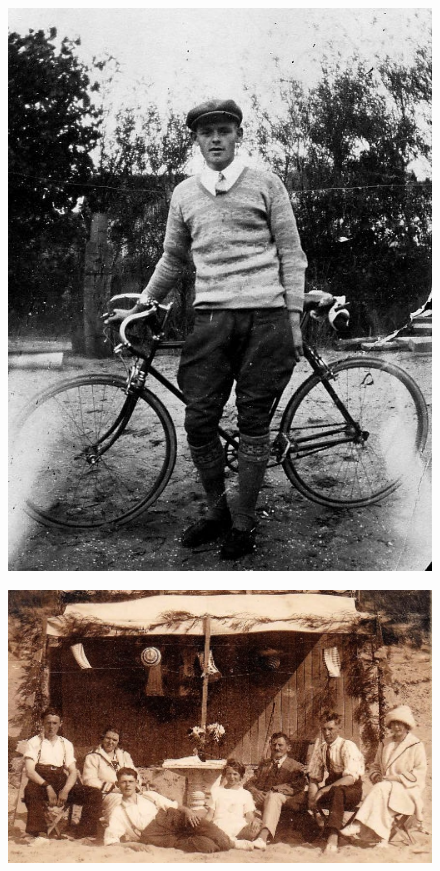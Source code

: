 \documentclass[10pt,twoside, openright]{memoir}
\begin{document}
\begin{figure}
\includegraphics[width=\textwidth]{img/29coppi}
\caption*{\footnotesize }
\end{figure}

\begin{figure}
\includegraphics[width=\textwidth]{img/30Heemskerk}
\caption*{\footnotesize }
\end{figure}
\end{document}
